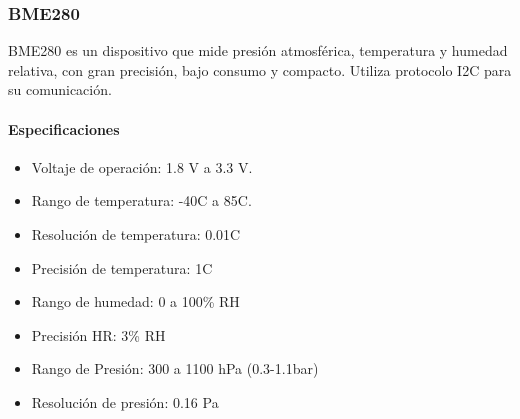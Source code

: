 		

	
	\subsubsection{BME280}
	BME280 es un dispositivo que mide presión atmosférica, temperatura y humedad relativa, con gran precisión, bajo consumo y compacto. Utiliza protocolo I2C para su comunicación.
	\paragraph*{Especificaciones}
	\begin{minipage}[t]{.7\textwidth}
		\begin{itemize}
			\item   Voltaje de operación: 1.8 V a 3.3 V.
			\item	Rango de temperatura: -40\grad C a 85\grad C.
			\item   Resolución de temperatura: 0.01\grad C
			\item	Precisión de temperatura: 1\grad C 
			\item	Rango de humedad: 0 a 100\% RH
			\item   Precisión HR: 3\% RH
			\item Rango de Presión: 300 a 1100 hPa (0.3-1.1bar)
			\item Resolución de presión: 0.16 Pa
		\end{itemize}
	\end{minipage}	
	\begin{minipage}[t]{.3\textwidth}
		\centering{}
		\label{fig:BME280}
	\end{minipage}

